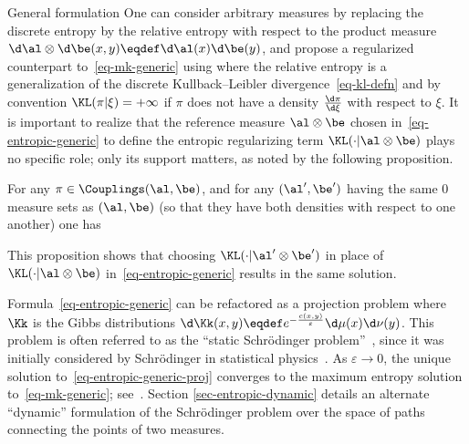 \begin{rem2}{General formulation}
One can consider arbitrary measures by replacing the discrete entropy by the relative entropy with respect to the product measure $\d\al\otimes\d\be(x,y) \eqdef \d\al(x)\d\be(y)$, and propose a regularized counterpart to~\eqref{eq-mk-generic} using
where the relative entropy is a generalization of the discrete Kullback--Leibler divergence~\eqref{eq-kl-defn}
and by convention $\KL(\pi|\xi)=+\infty$ if $\pi$ does not have a density $\frac{\d \pi}{\d\xi}$ with respect to $\xi$. 
%
It is important to realize that the reference measure $\al\otimes\be$ chosen in~\eqref{eq-entropic-generic} to define the entropic regularizing term $\KL(\cdot|\al\otimes\be)$ plays no specific role; only its support matters, as noted by the following proposition.

\begin{prop}
	For any $\pi \in \Couplings(\al,\be)$, and for any $(\al',\be')$  having the same 0 measure sets as $(\al,\be)$ (so that they have both densities with respect to one another) one has
\end{prop}

This proposition shows that choosing $\KL(\cdot|\al'\otimes\be')$ in place of $\KL(\cdot|\al\otimes\be)$ in~\eqref{eq-entropic-generic} results in the same solution.


Formula~\eqref{eq-entropic-generic} can be refactored as a projection problem
\eql{\label{eq-entropic-generic-proj}
	\umin{\pi \in \Couplings(\al,\be)} \KL(\pi|\Kk),
}
where $\Kk$ is the Gibbs distributions $\d\Kk(x,y) \eqdef e^{-\frac{c(x,y)}{\varepsilon}} \d\mu(x)\d\nu(y)$.
%
This problem is often referred to as the ``static Schr\"odinger problem''~\citep{LeonardSchroedinger,RuschendorfThomsen}, since it was initially considered by Schr\"odinger in statistical physics~\citep{Schroedinger31}. 
%
As $\varepsilon \rightarrow 0$, the unique solution to~\eqref{eq-entropic-generic-proj} converges to the maximum entropy solution to~\eqref{eq-mk-generic}; see~\citep{leonard2012schrodinger,2017-carlier-SIMA}.
%
Section \ref{sec-entropic-dynamic} details an alternate ``dynamic'' formulation of the Schr\"odinger problem over the space of paths connecting the points of two measures.
\end{rem2}

